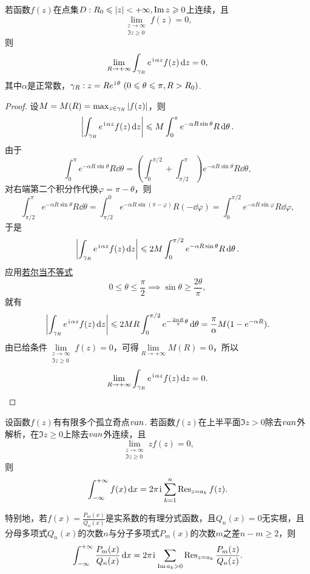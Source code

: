 \begin{lemma}[若尔当引理]\label{theorem:留数定理.计算积分路径上没有奇点的无穷限积分.引理2}
若函数\(f(z)\)在点集\(D: R_0 \leqslant \abs{z} < +\infty, \Im z \geqslant 0\)上连续，且\[
\lim\limits_{\substack{z\to\infty \\ \Im z \geqslant 0}} f(z) = 0,
\]则\begin{equation}
\lim\limits_{R\to+\infty} \int_{\gamma_R} e^{\kern1pt\mathrm{i}\kern1pt\alpha z} f(z) \dd{z} = 0,
\end{equation}
其中\(\alpha\)是正常数，\(\gamma_R: z = R e^{\iu\theta}\ (0\leqslant\theta\leqslant\pi, R>R_0)\).
\begin{proof}
设\(M = M(R) = \max_{z \in \gamma_R} \abs{f(z)}\)，则\[
\abs{ \int_{\gamma_R} e^{\kern1pt\mathrm{i}\kern1pt\alpha z} f(z) \dd{z} }
\leqslant M \int_0^{\pi} e^{-\alpha R \sin\theta} R \dd{\theta}.
\]由于\[
\int_0^{\pi} e^{-\alpha R \sin\theta} R \dd{\theta}
= \left(\int_0^{\pi/2} + \int_{\pi/2}^{\pi}\right) e^{-\alpha R \sin\theta} R \dd{\theta},
\]对右端第二个积分作代换\(\varphi=\pi-\theta\)，则\[
\int_{\pi/2}^{\pi} e^{-\alpha R \sin\theta} R \dd{\theta}
= \int_{\pi/2}^0 e^{-\alpha R \sin(\pi-\varphi)} R (-\dd{\varphi})
= \int_0^{\pi/2} e^{-\alpha R \sin\varphi} R \dd{\varphi},
\]于是\[
\abs{ \int_{\gamma_R} e^{\kern1pt\mathrm{i}\kern1pt\alpha z} f(z) \dd{z} }
\leqslant 2M \int_0^{\pi/2} e^{-\alpha R \sin\theta} R \dd{\theta}.
\]应用\hyperref[equation:微分中值定理.若尔当不等式]{若尔当不等式}\[
0\leqslant\theta\leqslant\frac{\pi}{2}
\implies
\sin\theta\geqslant\frac{2\theta}{\pi},
\]就有\[
\abs{ \int_{\gamma_R} e^{\kern1pt\mathrm{i}\kern1pt\alpha z} f(z) \dd{z} }
\leqslant 2MR \int_0^{\pi/2} e^{-\frac{2\alpha R}{\pi}\theta} \dd{\theta}
= \frac{\pi}{\alpha} M (1-e^{-\alpha R}).
\]由已给条件\(\lim\limits_{\substack{z\to\infty \\ \Im z \geqslant 0}} f(z) = 0\)，可得\(\lim\limits_{R\to+\infty} M(R) = 0\)，所以\[
\lim\limits_{R\to+\infty} \int_{\gamma_R} e^{\kern1pt\mathrm{i}\kern1pt\alpha z} f(z) \dd{z} = 0.
\qedhere
\]
\end{proof}
\end{lemma}

\begin{theorem}\label{theorem:留数定理.利用留数定理计算实积分2}
设函数\(f(z)\)有有限多个孤立奇点\(v{a}{n}\).
若函数\(f(z)\)在上半平面\(\Im z > 0\)除去\(v{a}{n}\)外解析，在\(\Im z \geqslant 0\)上除去\(v{a}{n}\)外连续，且\[
\lim\limits_{\substack{z\to\infty \\ \Im z \geqslant 0}} z f(z) = 0,
\]则\begin{equation}
\int_{-\infty}^{+\infty} f(x) \dd{x}
= 2\pi\kern1pt\mathrm{i}\kern1pt \sum\limits_{k=1}^n \operatorname{Res}_{z=a_k} f(z).
\end{equation}

特别地，若\(f(x) = \frac{P_m(x)}{Q_n(x)}\)是实系数的有理分式函数，且\(Q_n(x) = 0\)无实根，且分母多项式\(Q_n(x)\)的次数\(n\)与分子多项式\(P_m(x)\)的次数\(m\)之差\(n-m\geqslant2\)，则\begin{equation}
\int_{-\infty}^{+\infty} \frac{P_m(x)}{Q_n(x)} \dd{x}
= 2\pi\kern1pt\mathrm{i}\kern1pt \sum\limits_{\Im a_k > 0} \operatorname{Res}_{z=a_k} \frac{P_m(z)}{Q_n(z)}.
\end{equation}
\end{theorem}

